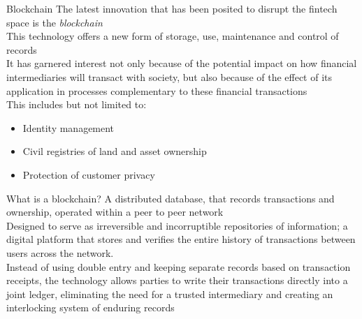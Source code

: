 \documentclass[9pt]{beamer}
\begin{document}
\begin{frame}{Blockchain}
	The latest innovation that has been posited to disrupt the fintech space is the \textit{blockchain} \\\vspace{3mm}
	This technology offers a new form of storage, use, maintenance and control of records \\\vspace{3mm}
	It has garnered interest not only because of the potential impact on how financial intermediaries will transact with society, but also because of the effect of its application in processes complementary to these financial transactions\\\vspace{3mm}
	This includes but not limited to:
	\begin{itemize}
		\item Identity management
		\item Civil registries of land and asset ownership
		\item Protection of customer privacy
	\end{itemize}
\end{frame}


\begin{frame}{What is a blockchain?}
	A distributed database, that records transactions and ownership, operated within a peer to peer network\\ \vspace{3mm}
	Designed to serve as irreversible and incorruptible repositories of information; a digital platform that stores and verifies the entire history of transactions between users across the network. \\ \vspace{3mm}
	Instead of using double entry and keeping separate records based on transaction receipts, the technology allows parties to write their transactions directly into a joint ledger, eliminating the need for a trusted intermediary and creating an interlocking system of enduring records \\ \vspace{3mm}
\end{frame}

\end{document}
